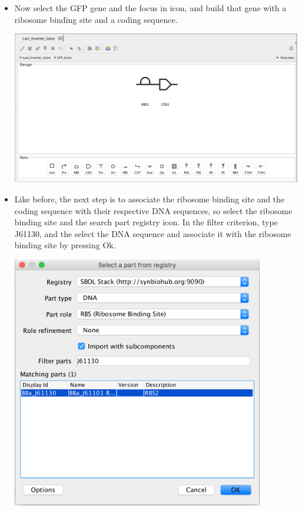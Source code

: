 \documentclass[titlepage,11pt]{article}
\begin{document}
\begin{itemize}
\item Now select the GFP gene and the focus in icon, and build that gene with a ribosome binding site and a coding sequence.

\begin{center}
\includegraphics[width=160mm]{screenshots/PartGFPFocusIn}
\end{center}

\item Like before, the next step is to associate the ribosome binding site and the coding sequence with their respective DNA sequences, so select the ribosome binding site and the search part registry icon. In the filter criterion, type J61130, and the select the DNA sequence and associate it with the ribosome binding site by pressing Ok.

\begin{center}
\includegraphics[width=110mm]{screenshots/PartRBSGFP}
\end{center}


\end{itemize}
\end{document}
